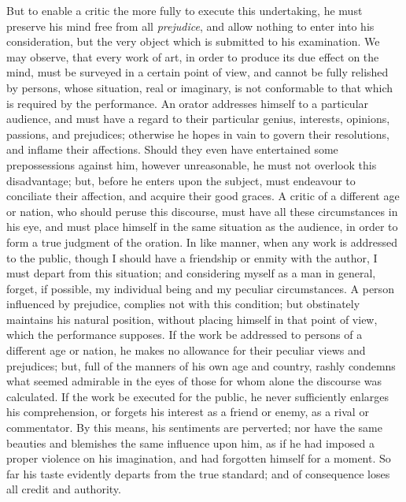 But to enable a critic the more fully to execute this undertaking, he
must preserve his mind free from all \textit{prejudice}, and allow
nothing to enter into his consideration, but the very object which is
submitted to his examination. We may observe, that every work of art,
in order to produce its due effect on the mind, must be surveyed in a
certain point of view, and cannot be fully relished by persons, whose
situation, real or imaginary, is not conformable to that which is
required by the performance. An orator addresses himself to a
particular audience, and must have a regard to their particular
genius, interests, opinions, passions, and prejudices; otherwise he
hopes in vain to govern their resolutions, and inflame their
affections. Should they even have entertained some prepossessions
against him, however unreasonable, he must not overlook this
disadvantage; but, before he enters upon the subject, must endeavour
to conciliate their affection, and acquire their good graces. A critic
of a different age or nation, who should peruse this discourse, must
have all these circumstances in his eye, and must place himself in the
same situation as the audience, in order to form a true judgment of
the oration. In like manner, when any work is addressed to the public,
though I should have a friendship or enmity with the author, I must
depart from this situation; and considering myself as a man in
general, forget, if possible, my individual being and my peculiar
circumstances.  A person influenced by prejudice, complies
not with this condition; but obstinately maintains his natural
position, without placing himself in that point of view, which the
performance supposes. If the work be addressed to persons of a
different age or nation, he makes no allowance for their peculiar
views and prejudices; but, full of the manners of his own age and
country, rashly condemns what seemed admirable in the eyes of those
for whom alone the discourse was calculated. If the work be executed
for the public, he never sufficiently enlarges his comprehension, or
forgets his interest as a friend or enemy, as a rival or commentator.
By this means, his sentiments are perverted; nor have the same
beauties and blemishes the same influence upon him, as if he had
imposed a proper violence on his imagination, and had forgotten
himself for a moment. So far his taste evidently departs from the true
standard; and of consequence loses all credit and authority.


